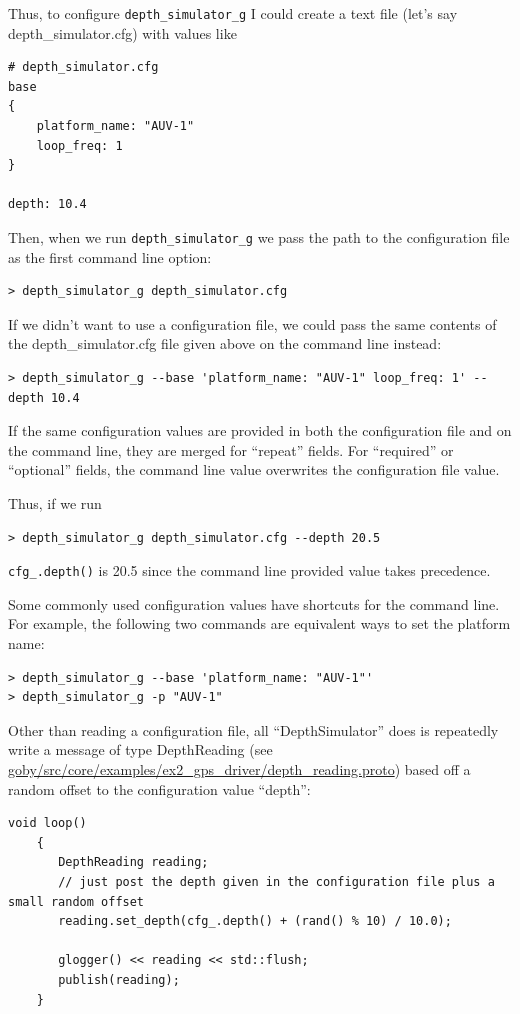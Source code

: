 \documentclass[11pt, letterpaper]{article}
\begin{document}
Thus, to configure \texttt{depth\_simulator\_g} I could create a text file (let's say depth\_simulator.cfg) with values like
\begin{verbatim}
# depth_simulator.cfg
base
{
    platform_name: "AUV-1"
    loop_freq: 1
}

depth: 10.4
\end{verbatim}

Then, when we run \texttt{depth\_simulator\_g} we pass the path to the configuration file as the first command line option:
\begin{verbatim}
> depth_simulator_g depth_simulator.cfg 
\end{verbatim}

If we didn't want to use a configuration file, we could pass the same contents of the depth\_simulator.cfg file given above on the command line instead:
\begin{verbatim}
> depth_simulator_g --base 'platform_name: "AUV-1" loop_freq: 1' --depth 10.4
\end{verbatim}

If the same configuration values are provided in both the configuration file and on the command line, they are merged for ``repeat'' fields. For ``required'' or ``optional'' fields, the command line value overwrites the configuration file value. 

Thus, if we run
\begin{verbatim}
> depth_simulator_g depth_simulator.cfg --depth 20.5
\end{verbatim}
\texttt{cfg\_.depth()} is 20.5 since the command line provided value takes precedence.

Some commonly used configuration values have shortcuts for the command line. For example, the following two commands are equivalent ways to set the platform name:
\begin{verbatim}
> depth_simulator_g --base 'platform_name: "AUV-1"'
> depth_simulator_g -p "AUV-1"
\end{verbatim}

Other than reading a configuration file, all ``DepthSimulator'' does is repeatedly write a message of type DepthReading (see \href{http://bazaar.launchpad.net/~goby-dev/goby/trunk/annotate/head:/src/core/examples/ex2_gps_driver/depth_reading.proto}{goby/src/core/examples/ex2\_gps\_driver/depth\_reading.proto}) based off a random offset to the configuration value ``depth'':
\begin{verbatim}
void loop()
    {
       DepthReading reading;
       // just post the depth given in the configuration file plus a small random offset
       reading.set_depth(cfg_.depth() + (rand() % 10) / 10.0);

       glogger() << reading << std::flush;
       publish(reading);    
    }
\end{verbatim}
\end{document}
